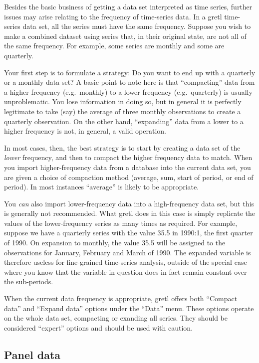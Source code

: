 Besides the basic business of getting a data set interpreted as time
series, further issues may arise relating to the frequency of
time-series data.  In a gretl time-series data set, all the series
must have the same frequency.  Suppose you wish to make a combined
dataset using series that, in their original state, are not all of the
same frequency.  For example, some series are monthly and some are
quarterly.

Your first step is to formulate a strategy: Do you want to end up with
a quarterly or a monthly data set?  A basic point to note here is
that ``compacting'' data from a higher frequency (e.g.\ monthly) to
a lower frequency (e.g.\ quarterly) is usually unproblematic.  You
lose information in doing so, but in general it is perfectly
legitimate to take (say) the average of three monthly observations to
create a quarterly observation.  On the other hand, ``expanding'' data
from a lower to a higher frequency is not, in general, a valid
operation.  

In most cases, then, the best strategy is to start by creating a data
set of the \textit{lower} frequency, and then to compact the higher
frequency data to match.  When you import higher-frequency data from a
database into the current data set, you are given a choice of
compaction method (average, sum, start of period, or end of period).
In most instances ``average'' is likely to be appropriate.  

You \textit{can} also import lower-frequency data into a
high-frequency data set, but this is generally not recommended.  What
gretl does in this case is simply replicate the values of the
lower-frequency series as many times as required. For example, suppose
we have a quarterly series with the value 35.5 in 1990:1, the first
quarter of 1990.  On expansion to monthly, the value 35.5 will be
assigned to the observations for January, February and March of 1990.
The expanded variable is therefore useless for fine-grained
time-series analysis, outside of the special case where you know that
the variable in question does in fact remain constant over the
sub-periods.

When the current data frequency is appropriate, gretl offers
both ``Compact data'' and ``Expand data'' options under the ``Data''
menu.  These options operate on the whole data set, compacting or
exanding all series.  They should be considered ``expert'' options
and should be used with caution. 


\subsection{Panel data}
\label{sec:panel-data}

